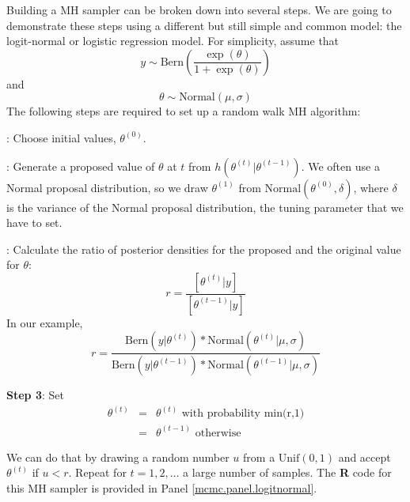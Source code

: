 Building a MH sampler can be broken down into several steps. We are going to demonstrate these steps using a different but still simple and common model: the logit-normal or logistic regression model. For simplicity, assume that
\[
y \sim \mbox{Bern} \left(\frac{\exp(\theta)}{1+ \exp(\theta)}\right)
\]
and
\[
\theta \sim \mbox{Normal}(\mu, \sigma)
\]
The following steps are required to set up a random walk MH algorithm:

{: Choose initial values, $\theta^{(0)}$.}

{: Generate a proposed value of $\theta$ at $t$ from $h(\theta^{(t)}|\theta^{(t-1)})$. }
We often use a Normal proposal distribution, so we draw $\theta^{(1)}$ from $\mbox{Normal}(\theta^{(0)}, \delta)$, where $\delta$ is the variance of the Normal proposal distribution, the tuning parameter that we have to set.

{: Calculate the ratio of posterior densities for the proposed and the original value for $\theta$: }
\[
r = \frac{[\theta^{(t)}|y]}  {[\theta^{(t-1)}|y]}
\]
In our example,
\[
r = \frac{\mbox{Bern}(y|\theta^{(t)}) * \mbox{Normal}(\theta^{(t)}|\mu, \sigma)} {\mbox{Bern}(y|\theta^{(t-1)}) * \mbox{Normal}(\theta^{(t-1)}|\mu, \sigma)}
\]


{\bf Step 3}: Set
\begin{eqnarray*}
\theta^{(t)}  &= &   \theta^{(t)} \mbox{ with probability min(r,1)}\\
	 & = & 	\theta^{(t-1)} \mbox{ otherwise }
\end{eqnarray*}



We can do that by drawing a random number $u$ from a
$\mbox{Unif}(0,1)$ and accept $\theta^{(t)}$ if
$u<r$.
Repeat for $t = 1,2,\ldots$ a large number of samples.
The {\bf R} code for this MH sampler is provided in Panel \ref{mcmc.panel.logitnormal}.

